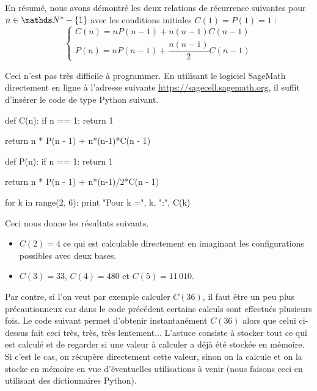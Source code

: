 En résumé, nous avons démontré les deux relations de récurrence suivantes pour $n \in \NN^* - \{1\}$ avec les conditions initiales $C(1) = P(1) = 1$ :
\begin{equation}
    \begin{cases}
        C(n) = n P(n - 1) + n(n-1) C(n-1) \\
        P(n) = n P(n - 1) + \dfrac{n(n-1)}{2} C(n - 1)
    \end{cases}
\end{equation}


\medskip

Ceci n'est pas très difficile à programmer. En utilisant le logiciel SageMath directement en ligne à l'adresse suivante \url{https://sagecell.sagemath.org}, il suffit d'insérer le code de type Python suivant.


\bigskip

\begin{myverb}
def C(n):
    if n == 1:
        return 1

    return n * P(n - 1) + n*(n-1)*C(n - 1)


def P(n):
    if n == 1:
        return 1

    return n * P(n - 1) + n*(n-1)/2*C(n - 1)


for k in range(2, 6):
    print "Pour k =", k, ":", C(k)

\end{myverb}

\bigskip

Ceci nous donne les résultats suivants.

\medskip

\begin{itemize}
    \item[\textbullet] $C(2) = 4$ ce qui est calculable directement en imaginant les configurations possibles avec deux bases.

    \medskip

    \item[\textbullet] $C(3) = 33$,
                       $C(4) = 480$ et
                       $C(5) = 11\,010$.
\end{itemize}


\medskip

Par contre, si l'on veut par exemple calculer $C(36)$, il faut être un peu plus précautionneux car dans le code précédent certains calculs sont effectués plusieurs fois. Le code suivant permet d'obtenir instantanément $C(36)$ alors que celui ci-dessus fait ceci très, très, très lentement... L'astuce consiste à stocker tout ce qui est calculé et de regarder si une valeur à calculer a déjà été stockée en mémoire. Si c'est le cas, on récupère directement cette valeur, sinon on la calcule et on la stocke en mémoire en vue d'éventuelles utilisations à venir (nous faisons ceci  en utilisant des dictionnaires Python).

